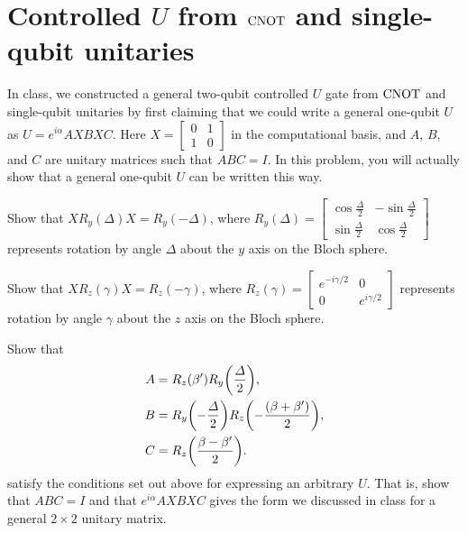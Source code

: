 \documentclass{../phys084}
\begin{document}
\begin{solution}
  \begin{problems}
  \item
  \item
  \item
  \end{problems}
\end{solution}

\section{Controlled \(U\) from \(\operatorname{CNOT}\) and single-qubit unitaries}

\begin{exercise}
  In class, we constructed a general two-qubit controlled \(U\) gate
  from \(\operatorname{CNOT}\) and single-qubit unitaries by first claiming that we
  could write a general one-qubit \(U\) as \(U = e^{i\alpha}AXBXC\).
  Here \(X =
  \begin{bmatrix}
    0 & 1 \\ 1 & 0
  \end{bmatrix}
  \) in the computational basis, and \(A\), \(B\), and \(C\) are
  unitary matrices such that \(ABC=I\).  In this problem, you will
  actually show that a general one-qubit \(U\) can be written this
  way.
\end{exercise}

\begin{problems}
\item Show that \(XR_y (\Delta) X = R_y (-\Delta)\), where
  \(R_y(\Delta) =
  \begin{bmatrix}
    \cos \frac \Delta 2 & -\sin \frac \Delta 2 \\
    \sin \frac \Delta 2 &  \cos \frac \Delta 2
  \end{bmatrix}
  \) represents rotation by angle \(\Delta\) about the \(y\) axis on
  the Bloch sphere.

\item Show that \(XR_z(\gamma)X = R_z(-\gamma)\), where
  \(R_z(\gamma) =
  \begin{bmatrix}
    e^{-i\gamma/2} & 0 \\ 0 & e^{i\gamma/2}
  \end{bmatrix}
  \) represents rotation by angle \(\gamma\) about the \(z\) axis on
  the Bloch sphere.

\item Show that
  \begin{align*}
    A &= R_z(\beta') R_y \prn*{\frac \Delta 2}, \\
    B &= R_y\prn*{-\frac \Delta 2} R_z\prn*{-\frac{(\beta+\beta')}{2}}, \\
    C &= R_z\prn*{\frac{\beta-\beta'}{2}}.
  \end{align*}
  satisfy the conditions set out above for expressing an arbitrary
  \(U\).  That is, show that \(ABC = I\) and that \(e^{i\alpha}AXBXC\)
  gives the form we discussed in class for a general \(2 \times 2\)
  unitary matrix.
\end{problems}

\begin{solution}
  \begin{problems}
  \item
  \item
  \item
  \end{problems}
\end{solution}
\end{document}
